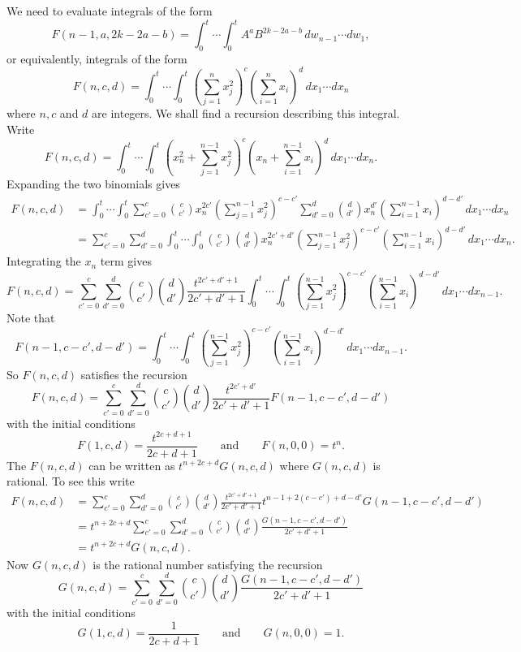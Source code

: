 \documentclass[draftcls, onecolumn, 11pt]{IEEEtran}
\begin{document}
We need to evaluate integrals of the form
\[
F(n-1,a,2k - 2a - b) = \int^{t}_{0} \cdots \int^{t}_{0} A^a B^{2k - 2a - b} \,dw_{n-1}\cdots dw_{1},
\]
or equivalently, integrals of the form
\[
F(n,c,d) = \int^{t}_{0} \cdots \int^{t}_{0} \left(\sum_{j=1}^{n} x_j^2\right)^c \left( \sum_{i=1}^{n} x_i \right)^d \,dx_1\cdots dx_{n}
\]
where $n,c$ and $d$ are integers.  We shall find a recursion describing this integral.  Write
\[
F(n,c,d) = \int^t_0 \cdots \int^t_0 \left(x_n^2 + \sum_{j=1}^{n-1} x_j^2\right)^c \left( x_n + \sum_{i=1}^{n-1} x_i \right)^d \,dx_1\cdots dx_n.
\]
Expanding the two binomials gives
\begin{align*}
F(n,c,d) &=  \int^t_0 \cdots \int^t_0 \sum_{c'=0}^{c} \binom{c}{c'} x_n^{2c'} \left(\sum_{j=1}^{n-1} x_j^2\right)^{c-c'}  \sum_{d'=0}^{d}\binom{d}{d'} x_n^{d'} \left(\sum_{i=1}^{n-1} x_i \right)^{d-d'} \,dx_1\cdots dx_{n} \\
&=  \sum_{c'=0}^{c} \sum_{d'=0}^d \int^t_0 \cdots \int^t_0 \binom{c}{c'} \binom{d}{d'} x_n^{2c'+d'} \left(\sum_{j=1}^{n-1} x_j^2\right)^{c-c'} \left(\sum_{i=1}^{n-1} x_i \right)^{d-d'} \,dx_1\cdots dx_{n}.
\end{align*}
Integrating the $x_n$ term gives
\[
F(n,c,d) = \sum_{c'=0}^{c} \sum_{d'=0}^{d} \binom{c}{c'}\binom{d}{d'} \frac{t^{2c'+d'+1}}{2c'+d'+1} \int^t_0 \cdots \int^t_0 \left(\sum_{j=1}^{n-1}x_j^2\right)^{c-c'}\left(\sum_{i=1}^{n-1} x_i \right)^{d-d'} \,dx_1\cdots dx_{n-1}.
\]
Note that
\[
F(n-1,c-c',d-d')  = \int^t_0 \cdots \int^t_0 \left(\sum_{j=1}^{n-1}x_j^2\right)^{c-c'}\left(\sum_{i=1}^{n-1} x_i \right)^{d-d'} \,dx_1\cdots dx_{n-1}.
\]
So $F(n,c,d)$ satisfies the recursion
\[
F(n,c,d) = \sum_{c'=0}^{c} \sum_{d'=0}^{d} \binom{c}{c'}\binom{d}{d'} \frac{t^{2c'+d'}}{2c'+d'+1}F(n-1,c-c',d-d')
\]
with the initial conditions
\[
F(1,c,d) = \frac{t^{2c+d+1}}{2c+d+1} \qquad \text{and} \qquad F(n,0,0) = t^n.
\]
The $F(n,c,d)$ can be written as $t^{n+2c+d}G(n,c,d)$ where $G(n,c,d)$ is rational.  To see this write
\begin{align*}
F(n,c,d) &=  \sum_{c'=0}^{c} \sum_{d'=0}^{d} \binom{c}{c'}\binom{d}{d'} \frac{t^{2c'+d'+1}}{2c'+d'+1}t^{n-1+2(c-c')+d-d'}G(n-1,c-c',d-d') \\
&=  t^{n+2c+d}\sum_{c'=0}^{c} \sum_{d'=0}^{d} \binom{c}{c'}\binom{d}{d'} \frac{G(n-1,c-c',d-d')}{2c'+d'+1} \\
&=  t^{n+2c+d}G(n,c,d).
\end{align*}
Now $G(n,c,d)$ is the rational number satisfying the recursion
\[
G(n,c,d) = \sum_{c'=0}^{c} \sum_{d'=0}^{d} \binom{c}{c'}\binom{d}{d'} \frac{G(n-1,c-c',d-d')}{2c'+d'+1}
\]
with the initial conditions
\[
G(1,c,d) = \frac{1}{2c+d+1} \qquad \text{and} \qquad G(n,0,0) = 1.
\]
\end{document}

